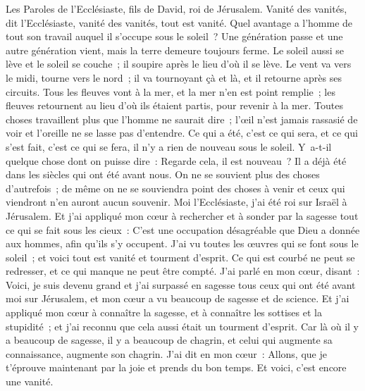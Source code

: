 \begin{multicols}{2}
\VerseOne{}Les Paroles de l'Ecclésiaste, fils de David, roi de Jérusalem.
Vanité des vanités, dit l'Ecclésiaste, vanité des vanités, tout est vanité.
Quel avantage a l'homme de tout son travail auquel il s'occupe sous le soleil~?
Une génération passe et une autre génération vient, mais la terre demeure toujours ferme.
Le soleil aussi se lève et le soleil se couche~; il soupire après le lieu d'où il se lève.
Le vent va vers le midi, tourne vers le nord~; il va tournoyant çà et là, et il retourne après ses circuits.
Tous les fleuves vont à la mer, et la mer n'en est point remplie~; les fleuves retournent au lieu d'où ils étaient partis, pour revenir à la mer. 
Toutes choses travaillent plus que l'homme ne saurait dire~; l'œil n'est jamais rassasié de voir et l'oreille ne se lasse pas d'entendre. 
Ce qui a été, c'est ce qui sera, et ce qui s'est fait, c'est ce qui se fera, il n'y a rien de nouveau sous le soleil.
Y~a-t-il quelque chose dont on puisse dire~: Regarde cela, il est nouveau~? Il a déjà été dans les siècles qui ont été avant nous.
On ne se souvient plus des choses d'autrefois~; de même on ne se souviendra point des choses à venir et ceux qui viendront n'en auront aucun souvenir. 
Moi l'Ecclésiaste, j'ai été roi sur Israël à Jérusalem.
Et j'ai appliqué mon cœur à rechercher et à sonder par la sagesse tout ce qui se fait sous les cieux~: C'est une occupation désagréable que Dieu a donnée aux hommes, afin qu'ils s'y occupent.
J'ai vu toutes les œuvres qui se font sous le soleil~; et voici tout est vanité et tourment d'esprit.
Ce qui est courbé ne peut se redresser, et ce qui manque ne peut être compté.
J'ai parlé en mon cœur, disant~: Voici, je suis devenu grand et j'ai surpassé en sagesse tous ceux qui ont été avant moi sur Jérusalem, et mon cœur a vu beaucoup de sagesse et de science.
Et j'ai appliqué mon cœur à connaître la sagesse, et à connaître les sottises et la stupidité~; et j'ai reconnu que cela aussi était un tourment d'esprit.
Car là où il y a beaucoup de sagesse, il y a beaucoup de chagrin, et celui qui augmente sa connaissance, augmente son chagrin.
\VerseOne{}J'ai dit en mon cœur~: Allons, que je t'éprouve maintenant par la joie et prends du bon temps. Et voici, c'est encore une vanité.

\end{multicols}
